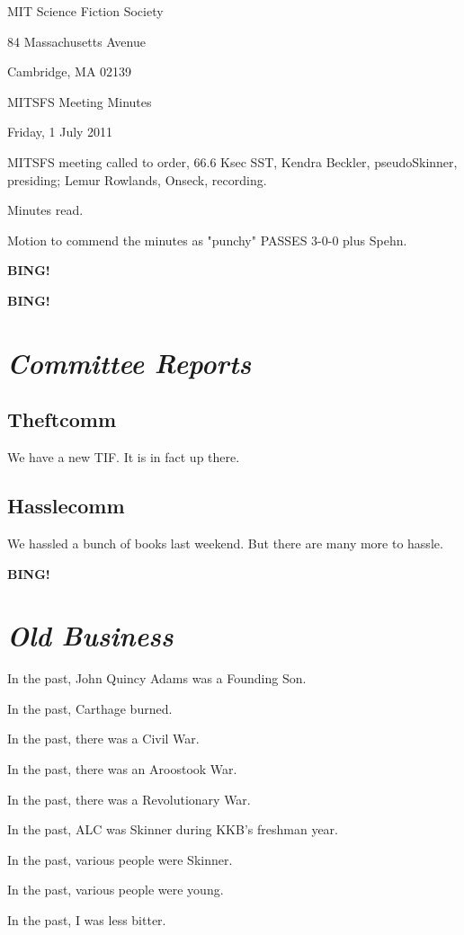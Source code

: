 \documentclass[10pt]{article}
\newcommand{\bing}{{\bf BING!} }
\newcommand{\goto}[1]{\bing \vskip 12pt \section*{{\em{#1}}}}
\newcommand{\ps}{ plus Spehn\xspace}
\newcommand{\skinner}{Kendra Beckler, pseudoSkinner}
\newcommand{\onseck}{Lemur Rowlands, Onseck}
\newcommand{\meetingdate}{Friday, 1 July 2011}
\begin{document}
\begin{center}

MIT Science Fiction Society

84 Massachusetts Avenue

Cambridge, MA 02139

\vspace{12pt}

MITSFS Meeting Minutes

\meetingdate

\end{center}

\vspace{18pt}

\setlength{\parskip}{6pt}

\noindent
MITSFS meeting called to order, 66.6 Ksec SST,
\skinner, presiding; \onseck, recording.

Minutes read.

Motion to commend the minutes as "punchy" PASSES 3-0-0\ps.

\bing

\goto{Committee Reports}

\subsection*{Theftcomm}

We have a new TIF.  It is in fact up there.

\subsection*{Hasslecomm}

We hassled a bunch of books last weekend.  But there are many more to hassle.

\goto{Old Business}

In the past, John Quincy Adams was a Founding Son.

In the past, Carthage burned.

In the past, there was a Civil War.

In the past, there was an Aroostook War.

In the past, there was a Revolutionary War.

In the past, ALC was Skinner during KKB's freshman year.

In the past, various people were Skinner.

In the past, various people were young.

In the past, I was less bitter.
\end{document}
